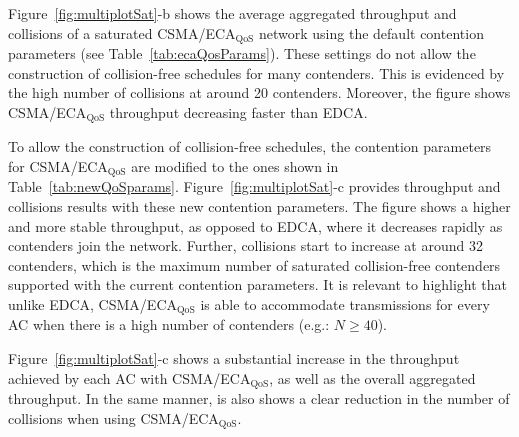 \begin{itemize}
Figure~\ref{fig:multiplotSat}-b shows the average aggregated throughput and collisions of a saturated CSMA/ECA$_{\text{QoS}}$ network using the default contention parameters (see Table~\ref{tab:ecaQosParams}). These settings do not allow the construction of collision-free schedules for many contenders. This is evidenced by the high number of collisions at around 20 contenders. Moreover, the figure shows CSMA/ECA$_{\text{QoS}}$ throughput decreasing faster than EDCA.

To allow the construction of collision-free schedules, the contention parameters for CSMA/ECA$_{\text{QoS}}$ are modified to the ones shown in Table~\ref{tab:newQoSparams}. Figure~\ref{fig:multiplotSat}-c provides throughput and collisions results with these new contention parameters. The figure shows a higher and more stable throughput, as opposed to EDCA, where it decreases rapidly as contenders join the network. Further, collisions start to increase at around 32 contenders, which is the maximum number of saturated collision-free contenders supported with the current contention parameters. It is relevant to highlight that unlike EDCA, CSMA/ECA$_{\text{QoS}}$ is able to accommodate transmissions for every AC when there is a high number of contenders (e.g.: $N\geq 40$).

%

Figure~\ref{fig:multiplotSat}-c shows a substantial increase in the throughput achieved by each AC with CSMA/ECA$_{\text{QoS}}$, as well as the overall aggregated throughput. In the same manner, is also shows a clear reduction in the number of collisions when using CSMA/ECA$_{\text{QoS}}$.

%


\end{itemize}
